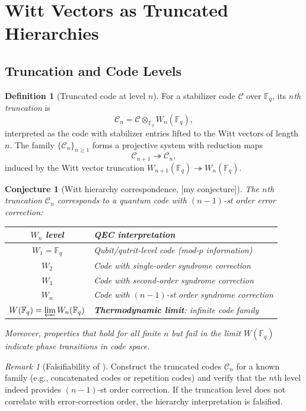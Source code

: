 \documentclass[12pt]{article}
\theoremstyle{definition}
\newtheorem{definition}{Definition}[section]
\theoremstyle{plain}
\newtheorem{conjecture}{Conjecture}[section]
\theoremstyle{remark}
\newtheorem{remark}{Remark}[section]
\newcommand{\myconj}{{\color{orange}[\textsf{my conjecture}]}}
\newcommand{\Fq}{\mathbb{F}_q}
\newcommand{\cC}{\mathcal{C}}
\begin{document}
\section{Witt Vectors as Truncated Hierarchies}

\subsection{Truncation and Code Levels}

\begin{definition}[Truncated code at level $n$]
For a stabilizer code $\cC$ over $\Fq$, its \emph{$n$th truncation} is
\[
\cC_n = \cC\otimes_{\Fq}W_n(\Fq),
\]
interpreted as the code with stabilizer entries lifted to the Witt vectors of length $n$. The family $\{\cC_n\}_{n\geq1}$ forms a projective system with reduction maps
\[
\cC_{n+1}\twoheadrightarrow\cC_n,
\]
induced by the Witt vector truncation $W_{n+1}(\Fq)\twoheadrightarrow W_n(\Fq)$.
\end{definition}

\begin{conjecture}[Witt hierarchy correspondence, \myconj]\label{conj:witt-hierarchy}
The $n$th truncation $\cC_n$ corresponds to a quantum code with $(n-1)$-st order error correction:

\begin{center}
\begin{tabular}{c|l}
$W_n$ level & QEC interpretation\\\hline
$W_1=\Fq$ & Qubit/qutrit-level code (mod-$p$ information)\\
$W_2$ & Code with single-order syndrome correction\\
$W_3$ & Code with second-order syndrome correction\\
$W_n$ & Code with $(n-1)$-st order syndrome correction\\
$W(\Fq)=\varprojlim W_n(\Fq)$ & \textbf{Thermodynamic limit}: infinite code family
\end{tabular}
\end{center}

Moreover, properties that hold for all finite $n$ but fail in the limit $W(\Fq)$ indicate \emph{phase transitions in code space}.
\end{conjecture}

\begin{remark}[Falsifiability of ]
Construct the truncated codes $\cC_n$ for a known family (e.g., concatenated codes or repetition codes) and verify that the $n$th level indeed provides $(n-1)$-st order correction. If the truncation level does not correlate with error-correction order, the hierarchy interpretation is falsified.
\end{remark}
\end{document}
